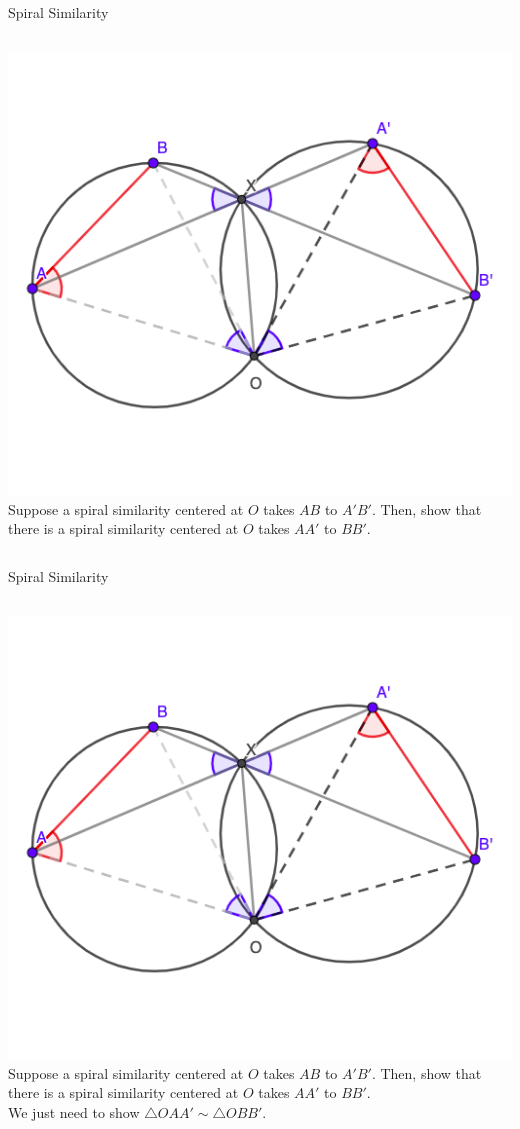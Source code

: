 \documentclass{beamer}
\begin{document}
\begin{frame}{Spiral Similarity}
	\begin{columns}
		\includegraphics[scale=0.37]{spi3.png}
		Suppose a spiral similarity centered at $O$ takes
		$AB$ to $A'B'$. Then, show that there is a spiral 
		similarity centered at $O$ takes $A A'$ to $BB'$.
	\end{columns}
\end{frame}
\begin{frame}{Spiral Similarity}
	\begin{columns}
		\column{0.6\textwidth}
		\includegraphics[scale=0.37]{spi3.png}
		\column{0.4\textwidth}
		Suppose a spiral similarity centered at $O$ takes
		$AB$ to $A'B'$. Then, show that there is a spiral 
		similarity centered at $O$ takes $A A'$ to $BB'$.\\
		\phantom{Spacing}
		We just need to show $\triangle OA A'\sim \triangle OBB'$.
	\end{columns}
\end{frame}
\end{document}
